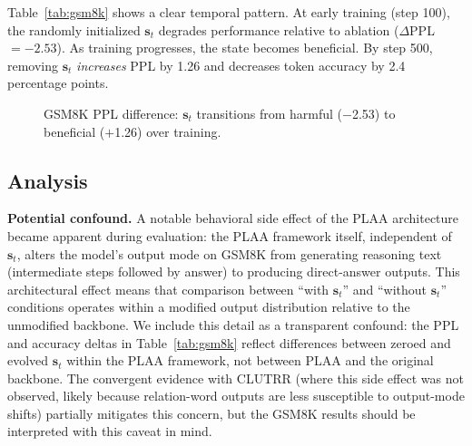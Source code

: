 \documentclass[11pt,a4paper]{article}
\begin{document}
Table~\ref{tab:gsm8k} shows a clear temporal pattern. At early training (step 100), the randomly initialized $\mathbf{s}_t$ degrades performance relative to ablation ($\Delta$PPL $= -2.53$). As training progresses, the state becomes beneficial. By step 500, removing $\mathbf{s}_t$ \emph{increases} PPL by 1.26 and decreases token accuracy by 2.4 percentage points.

\begin{figure}[t]
\centering
{}
\caption{GSM8K PPL difference: $\mathbf{s}_t$ transitions from harmful ($-$2.53) to beneficial ($+$1.26) over training.}
\label{fig:gsm8k_ppl}
\end{figure}

\subsection{Analysis}

\textbf{Potential confound.} A notable behavioral side effect of the PLAA architecture became apparent during evaluation: the PLAA framework itself, independent of $\mathbf{s}_t$, alters the model's output mode on GSM8K from generating reasoning text (intermediate steps followed by answer) to producing direct-answer outputs. This architectural effect means that comparison between ``with $\mathbf{s}_t$'' and ``without $\mathbf{s}_t$'' conditions operates within a modified output distribution relative to the unmodified backbone. We include this detail as a transparent confound: the PPL and accuracy deltas in Table~\ref{tab:gsm8k} reflect differences between zeroed and evolved $\mathbf{s}_t$ within the PLAA framework, not between PLAA and the original backbone. The convergent evidence with CLUTRR (where this side effect was not observed, likely because relation-word outputs are less susceptible to output-mode shifts) partially mitigates this concern, but the GSM8K results should be interpreted with this caveat in mind.
\end{document}
